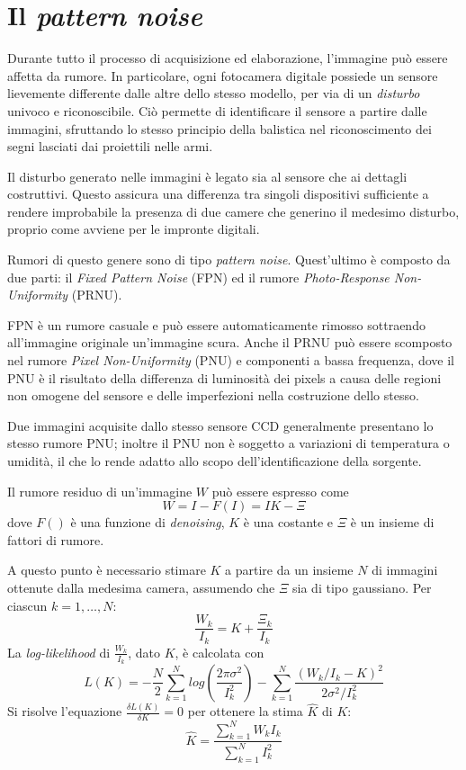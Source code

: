 \section{Il \emph{pattern noise}}

Durante tutto il processo di acquisizione ed elaborazione, l'immagine può essere affetta da rumore. 
In particolare, ogni fotocamera digitale possiede un sensore
lievemente differente dalle altre dello stesso modello, per via di un \emph{disturbo}
univoco e riconoscibile. Ciò permette di identificare il sensore a partire dalle
immagini, sfruttando lo stesso principio della balistica nel riconoscimento dei segni lasciati dai proiettili nelle armi.

Il disturbo generato nelle immagini è legato sia al sensore che ai dettagli costruttivi. Questo
assicura una differenza tra singoli dispositivi sufficiente a rendere improbabile
la presenza di due camere che generino il medesimo disturbo, proprio come avviene per le impronte digitali. 

Rumori di questo genere sono di tipo \emph{pattern noise}. Quest'ultimo è composto da due parti: il \emph{Fixed Pattern Noise} (FPN) ed il rumore \emph{Photo-Response Non-Uniformity} (PRNU).

FPN è un rumore casuale e può essere automaticamente rimosso sottraendo all'immagine originale un'immagine scura. Anche il PRNU può essere scomposto nel rumore \emph{Pixel Non-Uniformity} (PNU) e componenti a bassa frequenza, dove il PNU è il risultato della differenza di luminosità dei pixels a causa delle regioni non omogene del sensore e delle imperfezioni nella costruzione dello stesso.

Due immagini acquisite dallo stesso sensore CCD generalmente presentano lo stesso rumore PNU; inoltre il PNU non è soggetto a variazioni di temperatura o umidità, il che lo rende adatto allo scopo dell'identificazione della sorgente.

Il rumore residuo di un'immagine $W$ può essere espresso come
\begin{equation}
W = I - F(I) = IK - \Xi
\end{equation}
dove $F()$ è una funzione di \emph{denoising}, $K$ è una costante e $\Xi$ è un insieme di fattori di rumore.

A questo punto è necessario stimare $K$ a partire da un insieme $N$ di immagini ottenute dalla medesima camera, assumendo che $\Xi$ sia di tipo gaussiano. Per ciascun $k = 1, \ldots, N$:
\begin{equation}
\frac{W_k}{I_k} = K + \frac{\Xi_k}{I_k}
\end{equation}
La \emph{log-likelihood} di $\frac{W_k}{I_k}$, dato $K$, è calcolata con
\begin{equation}
L(K) = -\frac{N}{2} \sum_{k = 1}^{N} log(\frac{2\pi\sigma^2}{I_{k}^{2}}) -  \sum_{k = 1}^{N} \frac{(W_k / I_k - K)^2}{2\sigma^2 / I_{k}^{2}}
\end{equation}
Si risolve l'equazione $\frac{\delta L(K)}{\delta K} = 0$ per ottenere la stima $\hat{K}$ di $K$:
\begin{equation}
\hat{K} = \frac{\sum_{k = 1}^{N} W_k I_k}{\sum_{k = 1}^{N} I_{k}^{2}}
\end{equation}

